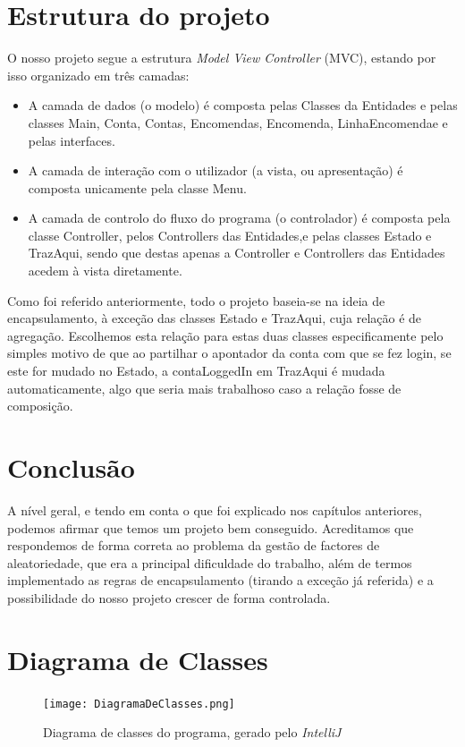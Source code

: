 \documentclass[a4paper]{report}
\begin{document}
	\chapter{Estrutura do projeto}
	
	O nosso projeto segue a estrutura \textit{Model View Controller} (MVC), estando por isso organizado em três camadas:
	\begin{itemize}
		\item A camada de dados (o modelo) é composta pelas Classes da Entidades e pelas classes Main, Conta, Contas, Encomendas, Encomenda, LinhaEncomendae e pelas interfaces.
		\item A camada de interação com o utilizador (a vista, ou apresentação) é composta unicamente pela classe Menu.
		\item A camada de controlo do fluxo do programa (o controlador) é composta pela classe Controller, pelos Controllers das Entidades,e pelas classes Estado e TrazAqui, sendo que destas apenas a Controller e Controllers das Entidades acedem à vista diretamente.
	\end{itemize}
      Como foi referido anteriormente, todo o projeto baseia-se na ideia de encapsulamento, à exceção das classes Estado e TrazAqui, cuja relação é de agregação. Escolhemos esta relação para estas duas classes especificamente pelo simples motivo de que ao partilhar o apontador da conta com que se fez login, se este for mudado no Estado, a contaLoggedIn em TrazAqui é mudada automaticamente, algo que seria mais trabalhoso caso a relação fosse de composição.
      

	
	

	\chapter{Conclusão}

	A nível geral, e tendo em conta o que foi explicado nos capítulos anteriores, podemos afirmar que temos um projeto bem conseguido. Acreditamos que respondemos de forma correta ao problema da gestão de factores de aleatoriedade, que era a principal dificuldade do trabalho, além de termos implementado as regras de encapsulamento (tirando a exceção já referida) e a possibilidade do nosso projeto crescer de forma controlada.
	
	\appendix
	
	\chapter{Diagrama de Classes}
	\begin{figure}[H]
		\begin{center}
			\texttt{[image: DiagramaDeClasses.png]}
			\caption{Diagrama de classes do programa, gerado pelo \emph{IntelliJ}}
		\end{center}
	\end{figure}
\end{document}
